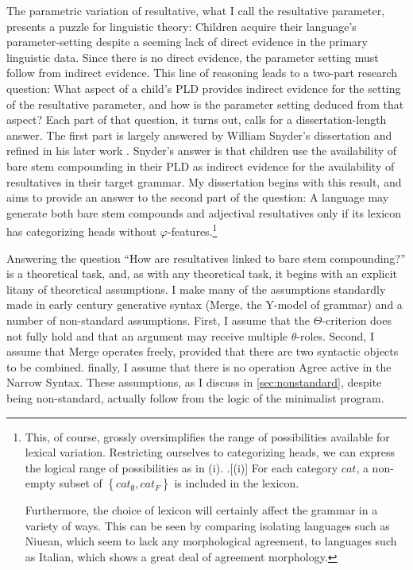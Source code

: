 The parametric variation of resultative, what I call the resultative parameter, presents a puzzle for linguistic theory:
Children acquire their language's parameter-setting despite a seeming lack of direct evidence in the primary linguistic data.
Since there is no direct evidence, the parameter setting must follow from indirect evidence.
This line of reasoning leads to a two-part research question:
What aspect of a child's PLD provides indirect evidence for the setting of the resultative parameter, and how is the parameter setting deduced from that aspect?
Each part of that question, it turns out, calls for a dissertation-length answer.
The first part is largely answered by William Snyder's dissertation \parencite{snyder1995language} and refined in his later work \parencite{snyder2001nature,snyder2012parameter,snyder2016compound}.
Snyder's answer is that children use the availability of bare stem compounding in their PLD as indirect evidence for the availability of resultatives in their target grammar.
My dissertation begins with this result, and aims to provide an answer to the second part of the question: 
A language may generate both bare stem compounds and adjectival resultatives only if its lexicon has categorizing heads without $\varphi$-features.\footnote{
	This, of course, grossly oversimplifies the range of possibilities available for lexical variation.
	Restricting ourselves to categorizing heads, we can express the logical range of possibilities as in (i).
	\ex.[(i)] For each category $cat$, a non-empty subset of $\left\{ cat_{\emptyset}, cat_{F} \right\}$ is included in the lexicon.

	Furthermore, the choice of lexicon will certainly affect the grammar in a variety of ways.
	This can be seen by comparing isolating languages such as Niuean, which seem to lack any morphological agreement, to languages such as Italian, which shows a great deal of agreement morphology.
}

Answering the question ``How are resultatives linked to bare stem compounding?'' is a theoretical task, and, as with any theoretical task, it begins with an explicit litany of theoretical assumptions.
I make many of the assumptions standardly made in early  century generative syntax (Merge, the Y-model of grammar) and a number of non-standard assumptions.
First, I assume that the $\Theta$-criterion does not fully hold and that an argument may receive multiple $\theta$-roles.
Second, I assume that Merge operates freely, provided that there are two syntactic objects to be combined.
finally, I assume that there is no operation Agree active in the Narrow Syntax.
These assumptions, as I discuss in \cref{sec:nonstandard}, despite being non-standard, actually follow from the logic of the minimalist program.

